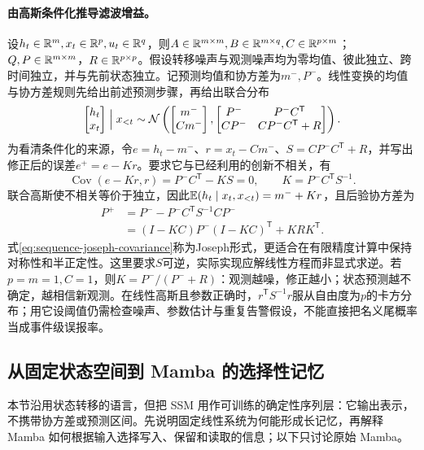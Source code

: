 \paragraph{由高斯条件化推导滤波增益。}
设$h_t\in\mathbb{R}^m,x_t\in\mathbb{R}^p,u_t\in\mathbb{R}^q$，则$A\in\mathbb{R}^{m\times m},B\in\mathbb{R}^{m\times q},C\in\mathbb{R}^{p\times m}$；$Q,P\in\mathbb{R}^{m\times m}$，$R\in\mathbb{R}^{p\times p}$。假设转移噪声与观测噪声均为零均值、彼此独立、跨时间独立，并与先前状态独立。记预测均值和协方差为$m^-,P^-$。线性变换的均值与协方差规则先给出前述预测步骤，再给出联合分布
\begin{equation}
 \begin{bmatrix}h_t\\x_t\end{bmatrix}\Bigm|x_{<t}
 \sim\mathcal N\left(
 \begin{bmatrix}m^-\\Cm^-\end{bmatrix},
 \begin{bmatrix}P^-&P^-C^{\mathsf T}\\CP^-&CP^-C^{\mathsf T}+R\end{bmatrix}\right).
\end{equation}
为看清条件化的来源，令$e=h_t-m^-$、$r=x_t-Cm^-$、$S=CP^-C^{\mathsf T}+R$，并写出修正后的误差$e^+=e-Kr$。要求它与已经利用的创新不相关，有
\begin{equation}
 \operatorname{Cov}(e-Kr,r)=P^-C^{\mathsf T}-KS=0,
 \qquad K=P^-C^{\mathsf T}S^{-1}.
\end{equation}
联合高斯使不相关等价于独立，因此$\mathbb{E}(h_t\mid x_t,x_{<t})=m^-+Kr$，且后验协方差为
\begin{align}
 P^+&=P^--P^-C^{\mathsf T}S^{-1}CP^-\\
 &=(I-KC)P^-(I-KC)^{\mathsf T}+KRK^{\mathsf T}.\label{eq:sequence-joseph-covariance}
\end{align}
式\eqref{eq:sequence-joseph-covariance}称为Joseph形式，更适合在有限精度计算中保持对称性和半正定性。这里要求$S$可逆，实际实现应解线性方程而非显式求逆。若$p=m=1,C=1$，则$K=P^-/(P^-+R)$：观测越噪，修正越小；状态预测越不确定，越相信新观测。在线性高斯且参数正确时，$r^{\mathsf T}S^{-1}r$服从自由度为$p$的卡方分布；用它设阈值仍需检查噪声、参数估计与重复告警假设，不能直接把名义尾概率当成事件级误报率。

\subsection{从固定状态空间到 Mamba 的选择性记忆}
\label{sec:sequence-mamba}
本节沿用状态转移的语言，但把 SSM 用作可训练的确定性序列层：它输出表示，不携带协方差或预测区间。先说明固定线性系统为何能形成长记忆，再解释 Mamba 如何根据输入选择写入、保留和读取的信息；以下只讨论原始 Mamba。

